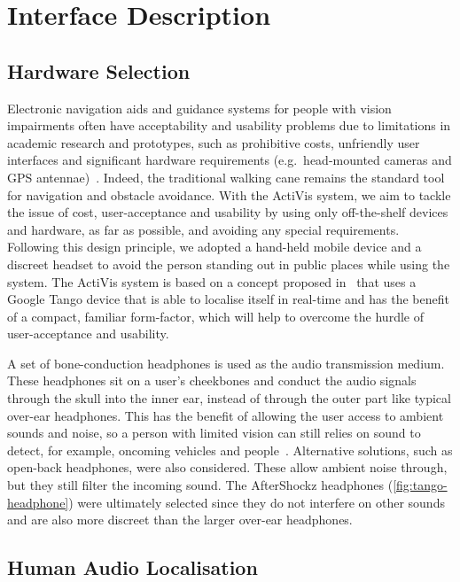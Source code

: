 \documentclass{llncs}
\begin{document}
\section{Interface Description}\label{sec:interface-design}

\subsection{Hardware Selection}

Electronic navigation aids and guidance systems for people with vision impairments often have acceptability and usability problems due to limitations in academic research and prototypes, such as prohibitive costs, unfriendly user interfaces and significant hardware requirements (e.g.\ head-mounted cameras and GPS antennae)~\cite{golledge2004stated,yusif2016older,arditi2013user}.
Indeed, the traditional walking cane remains the standard tool for navigation and obstacle avoidance. 
With the ActiVis system, we aim to tackle the issue of cost, user-acceptance and usability by using only off-the-shelf devices and hardware, as far as possible, and avoiding any special requirements.
Following this design principle, we adopted a hand-held mobile device and a discreet headset to avoid the person standing out in public places while using the system.
The ActiVis system is based on a concept proposed in~\cite{lock2017portable,lock2019active} that uses a Google Tango device that is able to localise itself in real-time and has the benefit of a compact, familiar form-factor, which will help to overcome the hurdle of user-acceptance and usability.

A set of bone-conduction headphones is used as the audio transmission medium.
These headphones sit on a user's cheekbones and conduct the audio signals through the skull into the inner ear, instead of through the outer part like typical over-ear headphones. 
This has the benefit of allowing the user access to ambient sounds and noise, so a person with limited vision can still relies on sound to detect, for example, oncoming vehicles and people~\cite{lichtenstein2012headphone}.
Alternative solutions, such as open-back headphones, were also considered. These allow ambient noise through, but they still filter the incoming sound. The AfterShockz headphones (\cref{fig:tango-headphone}) were ultimately selected since they do not interfere on other sounds and are also more discreet than the larger over-ear headphones. 

\subsection{Human Audio Localisation}
\end{document}
